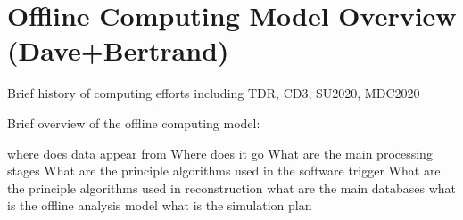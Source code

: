 \section{Offline Computing Model Overview (Dave+Bertrand)}
\label{sec:overview}

Brief history of computing efforts including TDR, CD3, SU2020, MDC2020

Brief overview of the offline computing model:

where does data appear from
Where does it go
What are the main processing stages
What are the principle algorithms used in the software trigger
What are the principle algorithms used in reconstruction
what are the main databases
what is the offline analysis model
what is the simulation plan


